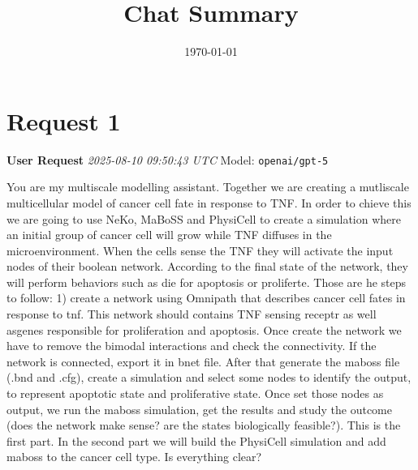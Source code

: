 \documentclass[11pt,a4paper]{article}
\title{Chat Summary}
\date{\today}
\begin{document}
\maketitle
\tableofcontents
\newpage

\section{Request 1}
\begin{userbox}
\textbf{User Request}
\quad \textit{2025-08-10 09:50:43 UTC}
\quad Model: \texttt{openai/gpt-5}

You are my multiscale modelling assistant. Together we are creating a mutliscale multicellular model of cancer cell fate in response to TNF. In order to chieve this we are going to use NeKo, MaBoSS and PhysiCell to create a simulation where an initial group of cancer cell will grow while TNF diffuses in the microenvironment. When the cells sense the TNF they will activate the input nodes of their boolean network. According to the final state of the network, they will perform behaviors such as die for apoptosis or proliferte. Those are he steps to follow: 1) create a network using Omnipath that describes cancer cell fates in response to tnf. This network should contains TNF sensing receptr as well asgenes responsible for proliferation and apoptosis. Once create the network we have to remove the bimodal interactions and check the connectivity. If the network is connected,  export it in bnet file. After that  generate the maboss file (.bnd and .cfg), create a simulation and select some nodes to identify the output, to represent apoptotic state and proliferative state. Once set those nodes as output, we run the maboss simulation, get the results and study the outcome (does the network make sense? are the states biologically feasible?).
This is the first part. In the second part we will build the PhysiCell simulation and add maboss to the cancer cell type. Is everything clear?

\end{userbox}
\end{document}
